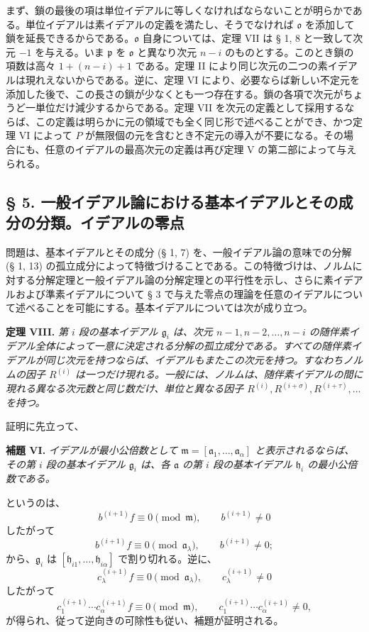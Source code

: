 \documentclass[11pt]{article}
\providecommand{\frakm}{\mathfrak m}
\providecommand{\frakp}{\mathfrak p}
\providecommand{\fraka}{\mathfrak a}
\providecommand{\frakg}{\mathfrak g}
\providecommand{\frako}{\mathfrak o}
\providecommand{\frakh}{\mathfrak h}
\providecommand{\frakp}{\mathfrak p}
\providecommand{\frako}{\mathfrak o}
\begin{document}
まず、鎖の最後の項は単位イデアルに等しくなければならないことが明らかである。単位イデアルは素イデアルの定義を満たし、そうでなければ $\frako$ を添加して鎖を延長できるからである。$\frako$ 自身については、定理 VII は § 1, 8 と一致して次元 $-1$ を与える。いま $\frakp$ を $\frako$ と異なり次元 $n-i$ のものとする。このとき鎖の項数は高々 $1+(n-i)+1$ である。定理 II により同じ次元の二つの素イデアルは現れえないからである。逆に、定理 VI により、必要ならば新しい不定元を添加した後で、この長さの鎖が少なくとも一つ存在する。鎖の各項で次元がちょうど一単位だけ減少するからである。定理 VII を次元の定義として採用するならば、この定義は明らかに元の領域でも全く同じ形で述べることができ、かつ定理 VI によって $P$ が無限個の元を含むとき不定元の導入が不要になる。その場合にも、任意のイデアルの最高次元の定義は再び定理 V の第二部によって与えられる。

\subsection*{§ 5. 一般イデアル論における基本イデアルとその成分の分類。イデアルの零点}

問題は、基本イデアルとその成分 (§ 1, 7) を、一般イデアル論の意味での分解 (§ 1, 13) の孤立成分によって特徴づけることである。この特徴づけは、ノルムに対する分解定理と一般イデアル論の分解定理との平行性を示し、さらに素イデアルおよび準素イデアルについて § 3 で与えた零点の理論を任意のイデアルについて述べることを可能にする。基本イデアルについては次が成り立つ。

\textbf{定理 VIII.} \emph{第 $i$ 段の基本イデアル $\frakg_i$ は、次元 $n-1,n-2,\ldots,n-i$ の随伴素イデアル全体によって一意に決定される分解の孤立成分である。すべての随伴素イデアルが同じ次元を持つならば、イデアルもまたこの次元を持つ。すなわちノルムの因子 $R^{(i)}$ は一つだけ現れる。一般には、ノルムは、随伴素イデアルの間に現れる異なる次元数と同じ数だけ、単位と異なる因子 $R^{(i)},R^{(i+\sigma)},R^{(i+\tau)},\ldots$ を持つ。}

証明に先立って、

\textbf{補題 VI.} \emph{イデアルが最小公倍数として $\frakm=[\fraka_1,\ldots,\fraka_\alpha]$ と表示されるならば、その第 $i$ 段の基本イデアル $\frakg_i$ は、各 $\fraka$ の第 $i$ 段の基本イデアル $\frakh_i$ の最小公倍数である。}

というのは、
\[
 b^{(i+1)}f\equiv0\pmod{\frakm},\qquad b^{(i+1)}\ne0
\]
したがって
\[
 b^{(i+1)}f\equiv0\pmod{\fraka_\lambda},\qquad b^{(i+1)}\ne0;
\]
から、$\frakg_i$ は $[\frakh_{i1},\ldots,\frakh_{i\alpha}]$ で割り切れる。逆に、
\[
 c_\lambda^{(i+1)}f\equiv0\pmod{\fraka_\lambda},\qquad c_\lambda^{(i+1)}\ne0
\]
したがって
\[
 c_1^{(i+1)}\cdots c_\alpha^{(i+1)}f\equiv0\pmod{\frakm},\qquad
 c_1^{(i+1)}\cdots c_\alpha^{(i+1)}\ne0,
\]
が得られ、従って逆向きの可除性も従い、補題が証明される。
\end{document}
